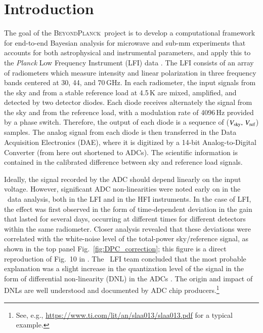 \documentclass[twocolumn]{aa}
\newcommand{\BP}{\textsc{BeyondPlanck}}
\begin{document}
\maketitle

\section{Introduction}
\label{sec:introduction}

The goal of the \BP\ project \citep{bp01} is to develop a computational framework for end-to-end Bayesian analysis for microwave and sub-mm experiments that accounts for both astrophysical and instrumental parameters, and apply this to the \textit{Planck} Low Frequency Instrument (LFI) data \citep{planck2016-l01,planck2016-l02}. The LFI consists of an array of radiometers which measure intensity and linear polarization in three frequency bands centered at 30, 44, and 70\,GHz. In each radiometer, the input signals from the sky and from a stable reference load at 4.5\,K are mixed, amplified, and detected by two detector diodes. Each diode receives alternately the signal from the sky and from the reference load, with a modulation rate of 4096\,Hz provided by a phase switch. Therefore, the output of each diode is a sequence of ($V_{\rm sky},\,V_{\rm ref}$) samples. The analog signal from each diode is then transferred in the Data Acquisition Electronics (DAE), where it is digitized by a 14-bit Analog-to-Digital Converter (from here out shortened to ADCs). The scientific information is contained in the calibrated difference between sky and reference load signals. 

Ideally, the signal recorded by the ADC should depend linearly on the input voltage. However, significant ADC non-linearities were noted early on in the \Planck\ data analysis, both in the LFI \citep{planck2013-p02,planck2013-p02a} and in the HFI \citep{planck2013-p03,planck2014-a08} instruments. In the case of LFI, the effect was first observed in the form of time-dependent deviation in the gain that lasted for several days, occurring at different times for different detectors within the same radiometer. Closer analysis revealed that these deviations were correlated with the white-noise level of the total-power sky/reference signal, as shown in the top panel Fig.~\ref{fig:DPC_correction}; this figure is a direct reproduction of Fig.~10 in \citet{planck2013-p02a}. The \Planck\ LFI team concluded that the most probable explanation was a slight increase in the quantization level of the signal in the form of  differential non-linearity (DNL) in the ADCs \citep{planck2013-p02a,planck2014-a04}. The origin and impact of DNLs are well understood and documented by ADC chip producers.\footnote{See, e.g., \url{https://www.ti.com/lit/an/slaa013/slaa013.pdf} for a typical example.}
\end{document}
